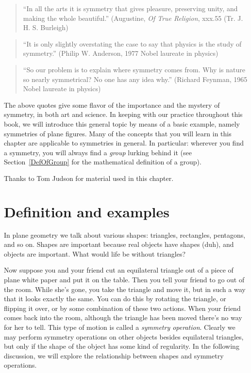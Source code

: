 


\begin{quote}
``In all the arts it is symmetry that gives pleasure, preserving unity, and making the whole beautiful.'' (Augustine, \emph{Of True Religion}, xxx.55 (Tr. J. H. S. Burleigh)
\end{quote}
\begin{quote}
``It is only slightly overstating the case to say that physics is the study of symmetry.'' (Philip W. Anderson, 1977 Nobel laureate in physics)
\end{quote}
\begin{quote}
``So our problem is to explain where symmetry comes from. Why is nature so nearly symmetrical? No one has any idea why.'' (Richard Feynman, 1965 Nobel laureate in physics)
\end{quote}

The above quotes give some flavor of the importance and the mystery of symmetry, in both art and science. In keeping with our practice throughout this book, we will introduce this general topic by means of a basic example, namely symmetries of plane figures. Many of the concepts that you will learn in this chapter are applicable to symmetries in general. In particular: wherever you find a symmetry, you will always find a \emph{group} lurking behind it (see Section~\ref{DefOfGroup} for the mathematical definition of a group).
\medskip

Thanks to Tom Judson for material used in this chapter.


\section{Definition and examples}

In plane geometry we talk about various shapes: triangles, rectangles, pentagons, and so on. Shapes are important because real objects have shapes (duh), and objects are important. What would life be without triangles?

Now suppose you and your friend cut an equilateral triangle out of a piece of plane white paper and put it on the table. Then you tell your friend to go out of the room. While she's gone, you take the triangle and move it, but in such a way that it looks exactly the same. You can do this by rotating the triangle, or flipping it over, or by some combination of these two actions. When your friend comes back into the room, although the triangle has been moved there's no way for her to tell. This type of motion is called a \emph{symmetry operation}. Clearly we may perform symmetry operations on other objects besides equilateral triangles, but only if the shape of the object has some kind of regularity. In the following discussion, we will explore the relationship between shapes and symmetry operations. 

